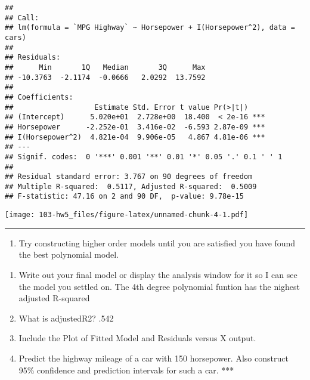 \documentclass[]{article}
\newenvironment{Shaded}{\begin{snugshade}}{\end{snugshade}}
\newcommand{\DataTypeTok}[1]{\textcolor[rgb]{0.13,0.29,0.53}{#1}}
\newcommand{\KeywordTok}[1]{\textcolor[rgb]{0.13,0.29,0.53}{\textbf{#1}}}
\newcommand{\NormalTok}[1]{#1}
\newcommand{\OperatorTok}[1]{\textcolor[rgb]{0.81,0.36,0.00}{\textbf{#1}}}
\newcommand{\StringTok}[1]{\textcolor[rgb]{0.31,0.60,0.02}{#1}}
\providecommand{\tightlist}{%
  \setlength{\itemsep}{0pt}\setlength{\parskip}{0pt}}
\begin{document}
\begin{verbatim}
## 
## Call:
## lm(formula = `MPG Highway` ~ Horsepower + I(Horsepower^2), data = cars)
## 
## Residuals:
##      Min       1Q   Median       3Q      Max 
## -10.3763  -2.1174  -0.0666   2.0292  13.7592 
## 
## Coefficients:
##                   Estimate Std. Error t value Pr(>|t|)    
## (Intercept)      5.020e+01  2.728e+00  18.400  < 2e-16 ***
## Horsepower      -2.252e-01  3.416e-02  -6.593 2.87e-09 ***
## I(Horsepower^2)  4.821e-04  9.906e-05   4.867 4.81e-06 ***
## ---
## Signif. codes:  0 '***' 0.001 '**' 0.01 '*' 0.05 '.' 0.1 ' ' 1
## 
## Residual standard error: 3.767 on 90 degrees of freedom
## Multiple R-squared:  0.5117, Adjusted R-squared:  0.5009 
## F-statistic: 47.16 on 2 and 90 DF,  p-value: 9.78e-15
\end{verbatim}

\begin{Shaded}
\end{Shaded}

\texttt{[image: 103-hw5\_files/figure-latex/unnamed-chunk-4-1.pdf]}

\begin{center}\rule{0.5\linewidth}{0.5pt}\end{center}

\begin{enumerate}
\def\labelenumi{\arabic{enumi}.}
\setcounter{enumi}{2}
\tightlist
\item
  Try constructing higher order models until you are satisfied you have
  found the best polynomial model.
\end{enumerate}

\begin{enumerate}
\def\labelenumi{\alph{enumi}.}
\tightlist
\item
  Write out your final model or display the analysis window for it so I
  can see the model you settled on. The 4th degree polynomial funtion
  has the nighest adjusted R-squared
\item
  What is adjustedR2? .542
\item
  Include the Plot of Fitted Model and Residuals versus X output.
\item
  Predict the highway mileage of a car with 150 horsepower. Also
  construct 95\% confidence and prediction intervals for such a car. ***
\end{enumerate}
\end{document}
